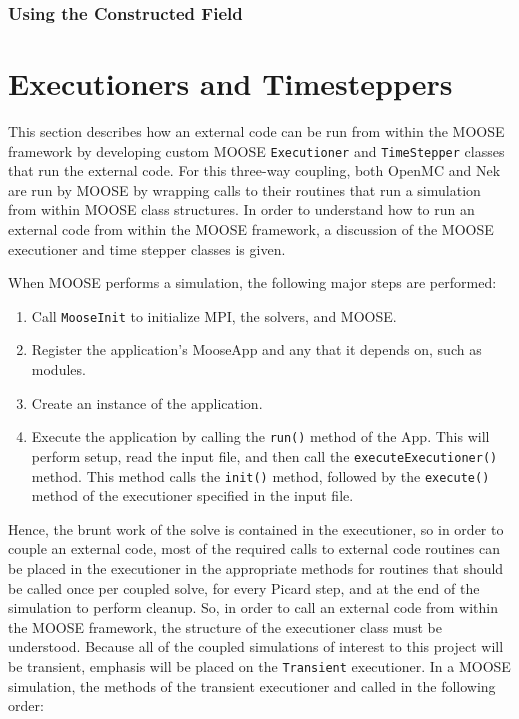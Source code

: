 \documentclass[10pt]{article}
\numberwithin{equation}{section} %
\begin{document}
\subsubsection{Using the Constructed Field}
 

\section{Executioners and Timesteppers}
This section describes how an external code can be run from within the MOOSE framework by developing custom MOOSE {\tt Executioner} and {\tt TimeStepper} classes that run the external code. For this three-way coupling, both OpenMC and Nek are run by MOOSE by wrapping calls to their routines that run a simulation from within MOOSE class structures. In order to understand how to run an external code from within the MOOSE framework, a discussion of the MOOSE executioner and time stepper classes is given. 

When MOOSE performs a simulation, the following major steps are performed:

\begin{enumerate}
\item Call {\tt MooseInit} to initialize MPI, the solvers, and MOOSE.
\item Register the application's MooseApp and any that it depends on, such as modules. 
\item Create an instance of the application.
\item Execute the application by calling the {\tt run()} method of the App. This will perform setup, read the input file, and then call the {\tt executeExecutioner()} method. This method calls the {\tt init()} method, followed by the {\tt execute()} method of the executioner specified in the input file.
\end{enumerate}

Hence, the brunt work of the solve is contained in the executioner, so in order to couple an external code, most of the required calls to external code routines can be placed in the executioner in the appropriate methods for routines that should be called once per coupled solve, for every Picard step, and at the end of the simulation to perform cleanup. So, in order to call an external code from within the MOOSE framework, the structure of the executioner class must be understood. Because all of the coupled simulations of interest to this project will be transient, emphasis will be placed on the {\tt Transient} executioner. In a MOOSE simulation, the methods of the transient executioner and called in the following order:
\end{document}
